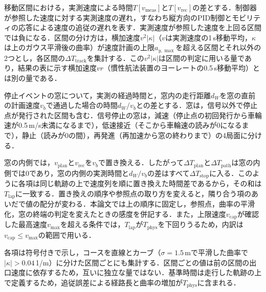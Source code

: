 \begin{description}[leftmargin=2\zw]
  \item[$\Delta T_{\mathrm{track}}$（速度の追従による時間差）] 移動区間における，実測速度による時間$T[v_{\mathrm{meas}}]$と$T[v_{\mathrm{rec}}]$の差とする．制御器が参照した速度に対する実測速度の遅れ，すなわち縦方向のPID制御とモビリティの応答による速度の追従の遅れを表す．実測速度が参照した速度を上回る区間では負になる．区間の分け方は，横加速度$v^2|\kappa|$（$v$は実測速度の1\,s移動平均，$\kappa$は上のガウス平滑後の曲率）が速度計画の上限$a_{y,\max}$を超える区間とそれ以外の2つとし，各区間の$\Delta T_{\mathrm{track}}$を集計する．この$v^2|\kappa|$は区間の判定に用いる量であり，結果の表に示す横加速度$vr$（慣性航法装置のヨーレートの0.5\,s移動平均）とは別の量である．
  \item[$\Delta T_{\mathrm{stop}}$（停止による時間差）] 停止イベントの窓について，実測の経過時間と，窓内の走行距離$d_W$を窓の直前の計画速度$v_b$で通過した場合の時間$d_W/v_b$との差とする．窓は，信号以外で停止点が発行された区間も含む．信号停止の窓は，減速（停止点の初回発行から車輪速が0.5\,m/s未満になるまで），低速接近（そこから車輪速の読みが0になるまで），静止（読みが0の間），再発進（再加速から窓の終わりまで）の4局面に分ける．
\end{description}
窓の内側では，$v_{\mathrm{plan}}$と$v_{\mathrm{rec}}$を$v_b$で置き換える．したがって$\Delta T_{\mathrm{plan}}$と$\Delta T_{\mathrm{path}}$は窓の内側では0であり，窓の内側の実測時間と$d_W/v_b$の差はすべて$\Delta T_{\mathrm{stop}}$に入る．このように各項は同じ軌跡の上で速度列を順に置き換えた時間差であるから，その和は$T_{\mathrm{lap}}$に一致する．置き換えの順序や参照点の取り方を変えると，隣り合う項のあいだで値の配分が変わる．本論文では上の順序に固定し，参照点，曲率の平滑化，窓の終端の判定を変えたときの感度を併記する．また，上限速度$v_{\mathrm{cap}}$が確認した最高速度$v_{\max}$を超える条件では，$T_{\mathrm{lap}}$が$T_{\mathrm{phys}}$を下回りうるため，内訳は$v_{\mathrm{cap}}\le v_{\max}$の範囲で用いる．

各項は符号付きで示し，コースを直線とカーブ（$\sigma=1.5$\,mで平滑した曲率で$|\kappa|>0.04$\,1/m）に分けた区間ごとにも集計する．区間ごとの値は前の区間の出口速度に依存するため，互いに独立な量ではない．基準時間は走行した軌跡の上で定義するため，追従誤差による経路長と曲率の増加が$T_{\mathrm{phys}}$に含まれる．

